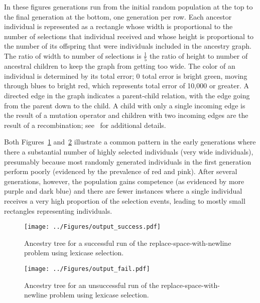 \documentclass{sig-alternate}
\begin{document}
In these figures generations run from the initial random population at the top to the final generation at the bottom, one generation per row. Each ancestor individual is represented as a rectangle whose width is proportional to the number of selections that individual received and whose height is proportional to the number of its offspring that were individuals included in the ancestry graph. The ratio of width to number of selections is $\frac{1}{5}$ the ratio of height to number of ancestral children to keep the graph from getting too wide. The color of an individual is determined by its total error; 0 total error is bright green, moving through blues to bright red, which represents total error of 10,000 or greater. A directed edge in the graph indicates a parent-child relation, with the edge going from the parent down to the child. A child with only a single incoming edge is the result of a mutation operator and children with two incoming edges are the result of a recombination; see~\cite{Helmuth:2015:dissertation,Spector:2013:GPTP} for additional details.

Both Figures~\ref{fig:success} and~\ref{fig:fail} illustrate a common pattern in the early generations where there a substantial number of highly selected individuals (very wide individuals), presumably because most randomly generated individuals in the first generation perform poorly (evidenced by the prevalence of red and pink). After several generations, however, the population gains competence (as evidenced by more purple and dark blue) and there are fewer instances where a single individual receives a very high proportion of the selection events, leading to mostly small rectangles representing individuals.

\begin{figure}[t]
\centering
\texttt{[image: ../Figures/output\_success.pdf]}
\caption{Ancestry tree for a successful run of the replace-space-with-newline problem using lexicase selection.}
\label{fig:success}
\end{figure}

\begin{figure}[p]
\centering
\texttt{[image: ../Figures/output\_fail.pdf]}
\caption{Ancestry tree for an unsuccessful run of the replace-space-with-newline problem using lexicase selection. }
\label{fig:fail}
\end{figure}


\end{document}
